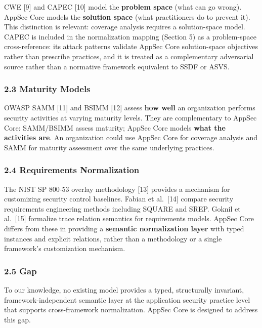 \documentclass[
]{article}
\begin{document}
CWE {[}9{]} and CAPEC {[}10{]} model the \textbf{problem space} (what
can go wrong). AppSec Core models the \textbf{solution space} (what
practitioners do to prevent it). This distinction is relevant: coverage
analysis requires a solution-space model. CAPEC is included in the
normalization mapping (Section 5) as a problem-space cross-reference:
its attack patterns validate AppSec Core solution-space objectives
rather than prescribe practices, and it is treated as a complementary
adversarial source rather than a normative framework equivalent to SSDF
or ASVS.

\subsubsection{2.3 Maturity Models}\label{maturity-models}

OWASP SAMM {[}11{]} and BSIMM {[}12{]} assess \textbf{how well} an
organization performs security activities at varying maturity levels.
They are complementary to AppSec Core: SAMM/BSIMM assess maturity;
AppSec Core models \textbf{what the activities are}. An organization
could use AppSec Core for coverage analysis and SAMM for maturity
assessment over the same underlying practices.

\subsubsection{2.4 Requirements
Normalization}\label{requirements-normalization}

The NIST SP 800-53 overlay methodology {[}13{]} provides a mechanism for
customizing security control baselines. Fabian et al.~{[}14{]} compare
security requirements engineering methods including SQUARE and SREP.
Goknil et al.~{[}15{]} formalize trace relation semantics for
requirements models. AppSec Core differs from these in providing a
\textbf{semantic normalization layer} with typed instances and explicit
relations, rather than a methodology or a single framework's
customization mechanism.

\subsubsection{2.5 Gap}\label{gap}

To our knowledge, no existing model provides a typed, structurally
invariant, framework-independent semantic layer at the application
security practice level that supports cross-framework normalization.
AppSec Core is designed to address this gap.
\end{document}
